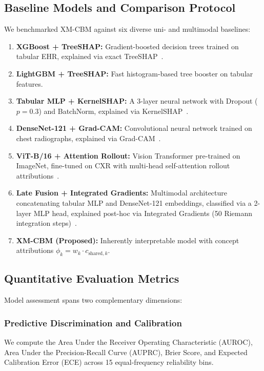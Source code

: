 \documentclass[10pt,journal,compsoc,twocolumn]{IEEEtran}
\begin{document}
\subsection{Baseline Models and Comparison Protocol}
We benchmarked XM-CBM against six diverse uni- and multimodal baselines:
\begin{enumerate}
    \item \textbf{XGBoost + TreeSHAP:} Gradient-boosted decision trees trained on tabular EHR, explained via exact TreeSHAP~\cite{lundberg2017unified}.
    \item \textbf{LightGBM + TreeSHAP:} Fast histogram-based tree booster on tabular features.
    \item \textbf{Tabular MLP + KernelSHAP:} A 3-layer neural network with Dropout ($p=0.3$) and BatchNorm, explained via KernelSHAP~\cite{lundberg2017unified}.
    \item \textbf{DenseNet-121 + Grad-CAM:} Convolutional neural network trained on chest radiographs, explained via Grad-CAM~\cite{selvaraju2017gradcam}.
    \item \textbf{ViT-B/16 + Attention Rollout:} Vision Transformer pre-trained on ImageNet, fine-tuned on CXR with multi-head self-attention rollout attributions~\cite{dosovitskiy2021image}.
    \item \textbf{Late Fusion + Integrated Gradients:} Multimodal architecture concatenating tabular MLP and DenseNet-121 embeddings, classified via a 2-layer MLP head, explained post-hoc via Integrated Gradients (50 Riemann integration steps)~\cite{sundararajan2017axiomatic}.
    \item \textbf{XM-CBM (Proposed):} Inherently interpretable model with concept attributions $\phi_k = w_k \cdot c_{\text{shared}, k}$.
\end{enumerate}

\subsection{Quantitative Evaluation Metrics}
Model assessment spans two complementary dimensions:

\subsubsection{Predictive Discrimination and Calibration}
We compute the Area Under the Receiver Operating Characteristic (AUROC), Area Under the Precision-Recall Curve (AUPRC), Brier Score, and Expected Calibration Error (ECE) across 15 equal-frequency reliability bins.
\end{document}
